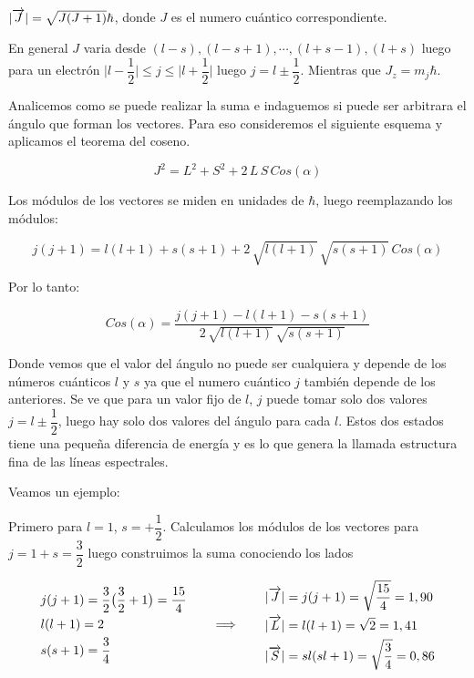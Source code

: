 $\vert \overrightarrow{J} \vert = \sqrt{J(J+1)}\hbar$, donde $J$ es el numero cuántico correspondiente.

En general $J$ varia desde $(l-s), (l-s+1), \cdots, (l+s-1), (l+s)$ luego para un electrón $\vert l-\dfrac{1}{2}\vert \leq j \leq \vert l+\dfrac{1}{2}\vert$ luego $j=l \pm \dfrac{1}{2}$. Mientras que $J_{z}=m_{j}\hbar$.
 
Analicemos como se puede realizar la suma e indaguemos si puede ser arbitrara el ángulo que forman los vectores. Para eso consideremos el siguiente esquema y aplicamos el teorema del coseno.

\begin{equation}
	J^{2}=L^{2}+S^{2}+2\,L\,S\,Cos(\alpha)
\end{equation}

Los módulos de los vectores se miden en unidades de $\hbar$, luego reemplazando los módulos:

\begin{equation}
	j(j+1)=l(l+1)+s(s+1)+2\,\sqrt{l(l+1)}\,\sqrt{s(s+1)}\,Cos(\alpha)
\end{equation}

Por lo tanto:

\begin{equation}
	Cos(\alpha) = \dfrac{j(j+1)-l(l+1)-s(s+1)}{2\,\sqrt{l(l+1)}\,\sqrt{s(s+1)}}
\end{equation}

Donde vemos que el valor del ángulo no puede ser cualquiera y depende de los números cuánticos $l$ y $s$ ya que el numero cuántico $j$ también depende de los anteriores. Se ve que para un valor fijo de $l$,  $j$ puede tomar solo dos valores $j=l \pm \dfrac{1}{2}$, luego hay solo dos valores del ángulo para cada $l$. Estos dos estados tiene una pequeña diferencia de energía y es lo que genera la llamada estructura fina de las líneas espectrales.

Veamos un ejemplo: 

Primero para $l=1$, $s=+\dfrac{1}{2}$. Calculamos los módulos de los vectores para $j=1+s=\dfrac{3}{2}$ luego construimos la suma conociendo los lados

\begin{equation*}
	\begin{aligned}[c]
		&j(j + 1)=\dfrac{3}{2}\big(\dfrac{3}{2}+1\big)= \dfrac{15}{4}\\
		&l(l + 1)=2\\
		&s(s + 1)=\dfrac{3}{4}
	\end{aligned}
\qquad\Longrightarrow\qquad
	\begin{aligned}[c]
		&\vert \overrightarrow{J} \vert = j(j + 1)=\sqrt{\dfrac{15}{4}}=1,90\\
		&\vert \overrightarrow{L} \vert=l(l + 1)=\sqrt{2}=1,41\\
		&\vert \overrightarrow{S} \vert=sl(sl + 1)=\sqrt{\dfrac{3}{4}}=0,86
	\end{aligned}
\end{equation*}

